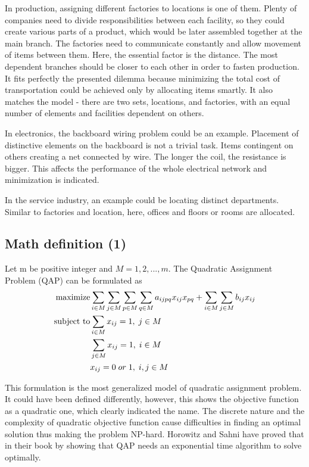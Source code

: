 In production, assigning different factories to locations is one of them.
Plenty of companies need to divide responsibilities between each facility, so they could create various parts of a product, which would be later assembled together at the main branch.
The factories need to communicate constantly and allow movement of items between them.
Here, the essential factor is the distance.
The most dependent branches should be closer to each other in order to fasten production.
It fits perfectly the presented dilemma because minimizing the total cost of transportation could be achieved only by allocating items smartly.
It also matches the model - there are two sets, locations, and factories, with an equal number of elements and facilities dependent on others.

In electronics, the backboard wiring problem could be an example.
Placement of distinctive elements on the backboard is not a trivial task.
Items contingent on others creating a net connected by wire.
The longer the coil, the resistance is bigger.
This affects the performance of the whole electrical network and minimization is indicated.

In the service industry, an example could be locating distinct departments.
Similar to factories and location, here, offices and floors or rooms are allocated.

\subsection{Math definition (1)}
Let m be positive integer and $M = { 1, 2, ..., m }$. The Quadratic Assignment Problem (QAP) can be formulated as
\begin{align}
  \text{maximize} &\null \sum_{i \in M} \sum_{j \in M} \sum_{p \in M} \sum_{q \in M} a_{ijpq}x_{ij}x_{pq} + \sum_{i \in M} \sum_{j \in M} b_{ij} x_{ij} \\
  \text{subject to} &\null \sum_{i \in M} x_{ij} = 1, \; j \in M \\
  &\null \sum_{j \in M} x_{ij} = 1, \; i \in M \\
  &\null x_{ij} = 0 \; or \; 1, \; i, j \in M
\end{align}

This formulation is the most generalized model of quadratic assignment problem.
It could have been defined differently, however, this shows the objective function as a quadratic one, which clearly indicated the name.
The discrete nature and the complexity of quadratic objective function cause difficulties in finding an optimal solution thus making the problem NP-hard.
Horowitz and Sahni have proved that in their book \cite{horowitz1978fundamentals} by showing that QAP needs an exponential time algorithm to solve optimally.


